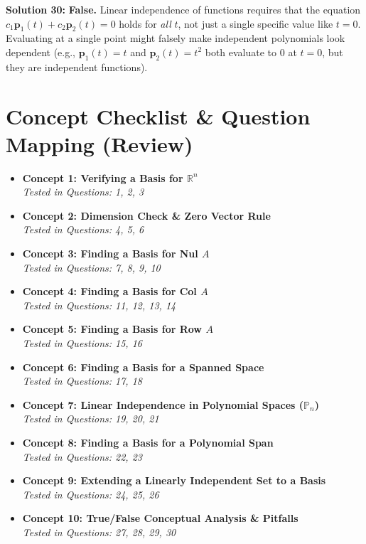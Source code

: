 \documentclass[11pt]{article}
\begin{document}
\vspace{0.5cm}
\textbf{Solution 30:}
\textbf{False.} Linear independence of functions requires that the equation $c_1\mathbf{p}_1(t) + c_2\mathbf{p}_2(t) = 0$ holds for \textit{all} $t$, not just a single specific value like $t=0$. Evaluating at a single point might falsely make independent polynomials look dependent (e.g., $\mathbf{p}_1(t)=t$ and $\mathbf{p}_2(t)=t^2$ both evaluate to 0 at $t=0$, but they are independent functions).

\newpage

\section{Concept Checklist \& Question Mapping (Review)}
\begin{itemize}
    \item \textbf{Concept 1: Verifying a Basis for $\mathbb{R}^n$} \\
    \textit{Tested in Questions: 1, 2, 3}
    
    \item \textbf{Concept 2: Dimension Check \& Zero Vector Rule} \\
    \textit{Tested in Questions: 4, 5, 6}
    
    \item \textbf{Concept 3: Finding a Basis for Nul $A$} \\
    \textit{Tested in Questions: 7, 8, 9, 10}
    
    \item \textbf{Concept 4: Finding a Basis for Col $A$} \\
    \textit{Tested in Questions: 11, 12, 13, 14}
    
    \item \textbf{Concept 5: Finding a Basis for Row $A$} \\
    \textit{Tested in Questions: 15, 16}
    
    \item \textbf{Concept 6: Finding a Basis for a Spanned Space} \\
    \textit{Tested in Questions: 17, 18}
    
    \item \textbf{Concept 7: Linear Independence in Polynomial Spaces ($\mathbb{P}_n$)} \\
    \textit{Tested in Questions: 19, 20, 21}
    
    \item \textbf{Concept 8: Finding a Basis for a Polynomial Span} \\
    \textit{Tested in Questions: 22, 23}
    
    \item \textbf{Concept 9: Extending a Linearly Independent Set to a Basis} \\
    \textit{Tested in Questions: 24, 25, 26}
    
    \item \textbf{Concept 10: True/False Conceptual Analysis \& Pitfalls} \\
    \textit{Tested in Questions: 27, 28, 29, 30}
\end{itemize}
\end{document}
